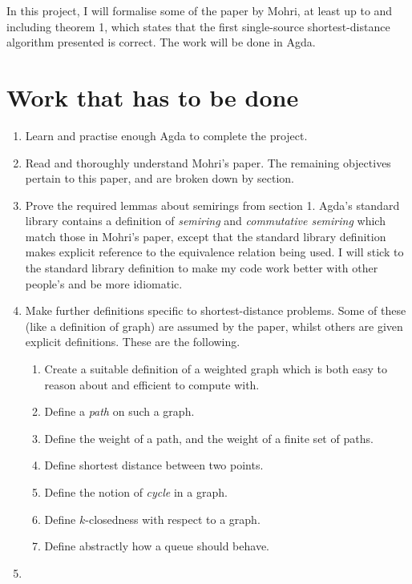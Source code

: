 In this project, I will formalise some of the paper by Mohri, at least up to and including theorem 1, which states that the first single-source shortest-distance algorithm presented is correct.
The work will be done in Agda.

\section*{Work that has to be done}

\begin{enumerate}
  \item
    Learn and practise enough Agda to complete the project.
  \item
    Read and thoroughly understand Mohri's paper.
    The remaining objectives pertain to this paper, and are broken down by section.
  \item
    Prove the required lemmas about semirings from section 1.
    Agda's standard library\cite{stdlib} contains a definition of \emph{semiring} and \emph{commutative semiring} which match those in Mohri's paper, except that the standard library definition makes explicit reference to the equivalence relation being used.
    I will stick to the standard library definition to make my code work better with other people's and be more idiomatic.
  \item
    Make further definitions specific to shortest-distance problems.
    Some of these (like a definition of graph) are assumed by the paper, whilst others are given explicit definitions.
    These are the following.
    \begin{enumerate}
      \item
        Create a suitable definition of a weighted graph which is both easy to reason about and efficient to compute with.
      \item
        Define a \emph{path} on such a graph.
      \item
        Define the weight of a path, and the weight of a finite set of paths.
      \item
        Define shortest distance between two points.
      \item
        Define the notion of \emph{cycle} in a graph.
      \item
        Define $k$-closedness with respect to a graph.
      \item
        Define abstractly how a queue should behave.
    \end{enumerate}
  \item

\end{enumerate}
